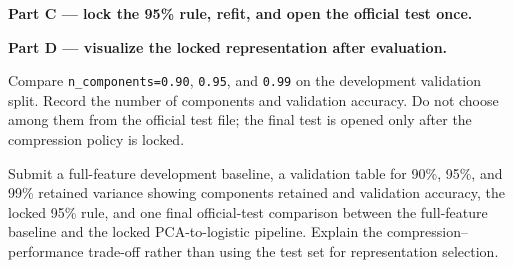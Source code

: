 \textbf{Part C --- lock the 95\% rule, refit, and open the official test once.}



\textbf{Part D --- visualize the locked representation after evaluation.}




\begin{tryit}
Compare \texttt{n\_components=0.90}, \texttt{0.95}, and \texttt{0.99} on the development validation split. Record the number of components and validation accuracy. Do not choose among them from the official test file; the final test is opened only after the compression policy is locked.
\end{tryit}

\begin{labdeliverable}
Submit a full-feature development baseline, a validation table for 90\%, 95\%, and 99\% retained variance showing components retained and validation accuracy, the locked 95\% rule, and one final official-test comparison between the full-feature baseline and the locked PCA-to-logistic pipeline. Explain the compression--performance trade-off rather than using the test set for representation selection.
\end{labdeliverable}
